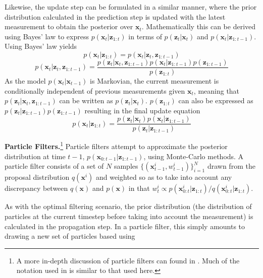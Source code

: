 \documentclass[letterpaper, 10 pt, conference]{ieeeconf}
\renewcommand{\vec}[1]{\boldsymbol{#1}}
\begin{document}
Likewise, the update step can be formulated in a similar manner, where the prior distribution calculated in the prediction step is updated with the latest measurement to obtain the posterior over $\vec{x}_t$. Mathematically this can be derived using Bayes' law to express $p(\vec{x}_t|\vec{z}_{1:t})$ in terms of $p(\vec{z}_t|\vec{x}_t)$ and $p(\vec{x}_t|\vec{z}_{1:t-1})$. Using Bayes' law yields
\begin{equation*}
	p(\vec{x}_t|\vec{z}_{1:t}) = p(\vec{x}_t|\vec{z}_t,\vec{z}_{1:t-1})
\end{equation*}
\begin{equation*}
p(\vec{x}_t|\vec{z}_t,\vec{z}_{1:t-1}) = \frac{p(\vec{z}_t|\vec{x}_t, \vec{z}_{1:t-1})p(\vec{x}_t|\vec{z}_{1:t-1})p(\vec{z}_{1:t-1})}{p(\vec{z}_{1:t})}
\end{equation*}
As the model $p(\vec{x}_t|\vec{x}_{t-1})$ is Markovian, the current measurement is conditionally independent of previous measurements given $\vec{x}_t$, meaning that $p(\vec{z}_{t}|\vec{x}_t, \vec{z}_{1:t-1})$ can be written as $p(\vec{z}_t|\vec{x}_t)$. $p(\vec{z}_{1:t})$ can also be expressed as $p(\vec{z}_t|\vec{z}_{1:t-1})p(\vec{z}_{1:t-1})$ resulting in the final update equation \citep{ParticleNotes}
\begin{equation} \label{eq:update}
	p(\vec{x}_t|\vec{z}_{1:t}) = \frac{p(\vec{z}_{t}|\vec{x}_t)p(\vec{x}_{t}|\vec{z}_{1:t-1})}{p(\vec{z}_t|\vec{z}_{1:t-1})}
\end{equation}


\textbf{Particle Filters.}\footnote{A more in-depth discussion of particle filters can found in \citep{ParticleNotes}. Much of the notation used in \citep{ParticleNotes} is similar to that used here.} Particle filters attempt to approximate the posterior distribution at time $t-1$, $p(\vec{x}_{0:t-1}|\vec{z}_{1:t-1})$, using Monte-Carlo methods. A particle filter consists of a set of $N$ samples $\{ (\vec{x}^i_{t-1}, w^i_{t-1}) \}_{i=1}^N$ drawn from the proposal distribution $q(\vec{x}^i)$ and weighted so as to take into account any discrepancy between $q(\vec{x})$ and $p(\vec{x})$ in that $w^i_t \propto p(\vec{x}^i_{0:t}|\vec{z}_{1:t})/q(\vec{x}^i_{0:t}|\vec{z}_{1:t})$.

As with the optimal filtering scenario, the prior distribution (the distribution of particles at the current timestep before taking into account the measurement) is calculated in the propagation step. In a particle filter, this simply amounts to drawing a new set of particles based using
\end{document}
